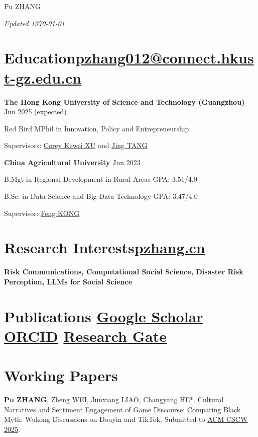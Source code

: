\documentclass[letterpaper, 11pt]{article}
\newcommand{\sepspace}{\vspace{0.5em}}
\newcommand{\makesectionheading}[2]{%
  \section*{#1\hfill\normalsize#2}%
}
\begin{document}
\setlength{\parindent}{0pt}

\begin{center}
    \Huge Pu ZHANG
\end{center}
\hfill{\it\footnotesize Updated \today}

\makesectionheading{Education}{\href{mailto:pzhang012@connect.hkust-gz.edu.cn}{pzhang012@connect.hkust-gz.edu.cn}}

\textbf{The Hong Kong University of Science and Technology (Guangzhou)} \hfill Jun 2025 (expected)

Red Bird MPhil in Innovation, Policy and Entrepreneurship

Supervisors: \href{https://facultyprofiles.hkust-gz.edu.cn/faculty-personal-page/XU-Kewei/coreyxu}{Corey Kewei XU} and \href{https://facultyprofiles.hkust-gz.edu.cn/faculty-personal-page/TANG-Jing/jingtang}{Jing TANG} 

\sepspace
\textbf{China Agricultural University} \hfill Jun 2023

B.Mgt in Regional Development in Rural Areas \hfill GPA: 3.51/4.0

B.Sc. in Data Science and Big Data Technology \hfill GPA: 3.47/4.0

Supervisor: \href{https://cohd.cau.edu.cn/art/2020/11/27/art_48059_998984.html}{Feng KONG} 

\makesectionheading{Research Interests}{\href{https://pzhang.cn}{pzhang.cn}}
\textbf{Risk Communications, Computational Social Science, Disaster Risk Perception, LLMs for Social Science}

\makesectionheading{Publications}{%
\href{https://scholar.google.com/citations?user=DBKpQPQAAAAJ}{Google Scholar}%
\hspace{0.1in}\href{https://orcid.org/0000-0002-7501-2124}{ORCID}%
\hspace{0.1in}\href{https://www.researchgate.net/profile/Pu-Zhang-33/}{Research Gate}}

\begingroup
\setlength{\parskip}{0pt}
\nocite{*}
\printbibliography[heading=none]
\endgroup

\section{Working Papers}

\textbf{Pu ZHANG}, Zheng WEI, Junxiang LIAO, Changyang HE*. Cultural Narratives and Sentiment Engagement of Game Discourse: Comparing Black Myth: Wukong Discussions on Douyin and TikTok. Submitted to \href{https://cscw.acm.org/2025/}{ACM CSCW 2025}.
\end{document}
